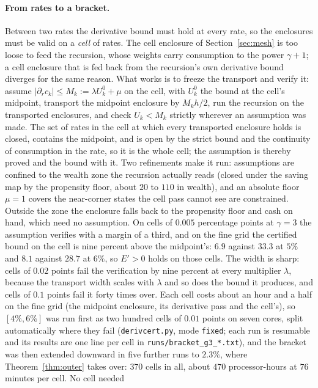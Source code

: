 \paragraph{From rates to a bracket.} Between two rates the derivative bound must hold at every rate,
so the enclosures must be valid on a \emph{cell} of rates. The cell enclosure of Section~\ref{sec:mesh}
is too loose to feed the recursion, whose weights carry consumption to the power $\gamma+1$; a cell
enclosure that is fed back from the recursion's own derivative bound diverges for the same reason. What
works is to freeze the transport and verify it: assume $|\partial_rc_k|\le M_k:=\lambda U^0_k+\mu$ on
the cell, with $U^0_k$ the bound at the cell's midpoint, transport the midpoint enclosure by
$M_kh/2$, run the recursion on the transported enclosures, and check $U_k<M_k$ strictly wherever an
assumption was made. The set of rates in the cell at which every transported enclosure holds is
closed, contains the midpoint, and is open by the strict bound and the continuity of consumption in
the rate, so it is the whole cell; the assumption is thereby proved and the bound with it. Two
refinements make it run: assumptions are confined to the wealth zone the recursion actually reads
(closed under the saving map by the propensity floor, about $20$ to $110$ in wealth), and an absolute
floor $\mu=1$ covers the near-corner states the cell pass cannot see are constrained. Outside the zone the
enclosure falls back to the propensity floor and cash on hand, which need no assumption. On cells of
$0.005$ percentage points at $\gamma=3$ the assumption verifies with a margin of a third, and on the
fine grid the certified bound on the cell is nine percent above the midpoint's: $6.9$ against $33.3$
at $5\%$ and $8.1$ against $28.7$ at $6\%$, so $E'>0$ holds on those cells. The width is sharp: cells
of $0.02$ points fail the verification by nine percent at every multiplier $\lambda$, because the
transport width scales with $\lambda$ and so does the bound it produces, and cells of $0.1$ points
fail it forty times over. Each cell costs about an hour and a half on the fine grid (the midpoint enclosure, its derivative pass and
the cell's), so $[4\%,6\%]$ was run first as two hundred cells of $0.01$ points on seven cores,
split automatically where they fail (\texttt{derivcert.py}, mode \texttt{fixed}; each run is
resumable and its results are one line per cell in \texttt{runs/bracket\_g3\_*.txt}), and the
bracket was then extended downward in five further runs to $2.3\%$, where Theorem~\ref{thm:outer}
takes over: $370$ cells in all, about $470$ processor-hours at $76$ minutes per cell. No cell needed
